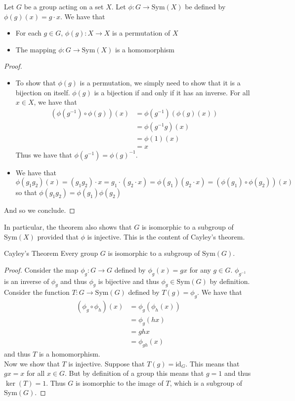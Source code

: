 \documentclass[a4paper]{article}
\begin{document}
\begin{prp}{}{} Let $G$ be a group acting on a set $X$. Let $\phi:G\to\text{Sym}(X)$ be defined by $\phi(g)(x)=g\cdot x$. We have that 
\begin{itemize}
\item For each $g\in G$, $\phi(g):X\to X$ is a permutation of $X$
\item The mapping $\phi:G\to\text{Sym}(X)$ is a homomorphism
\end{itemize}
\begin{proof}~\\
\begin{itemize}
\item To show that $\phi(g)$ is a permutation, we simply need to show that it is a bijection on itself. $\phi(g)$ is a bijection if and only if it has an inverse. For all $x\in X$, we have that 
\begin{align*}
(\phi(g^{-1})\circ\phi(g))(x)&=\phi(g^{-1})(\phi(g)(x))\\
&=\phi(g^{-1}g)(x)\\
&=\phi(1)(x)\\
&=x
\end{align*} Thus we have that $\phi(g^{-1})=\phi(g)^{-1}$. 
\item We have that $$\phi(g_1g_2)(x)=(g_1g_2)\cdot x=g_1\cdot(g_2\cdot x)=\phi(g_1)(g_2\cdot x)=(\phi(g_1)\circ\phi(g_2))(x)$$ so that $\phi(g_1g_2)=\phi(g_1)\phi(g_2)$
\end{itemize}
And so we conclude. 
\end{proof}
\end{prp}

In particular, the theorem also shows that $G$ is isomorphic to a subgroup of $\text{Sym}(X)$ provided that $\phi$ is injective. This is the content of Cayley's theorem. 

\begin{thm}{Cayley's Theorem}{} Every group $G$ is isomorphic to a subgroup of $\text{Sym}(G)$. 
\begin{proof}
Consider the map $\phi_g:G\to G$ defined by $\phi_g(x)=gx$ for any $g\in G$. $\phi_{g^{-1}}$ is an inverse of $\phi_g$ and thus $\phi_g$ is bijective and thus $\phi_g\in\text{Sym}(G)$ by definition. \\
Consider the function $T:G\to\text{Sym}(G)$ defined by $T(g)=\phi_g$. We have that 
\begin{align*}
(\phi_g\circ\phi_h)(x)&=\phi_g(\phi_h(x))\\
&=\phi_g(hx)\\
&=ghx\\
&=\phi_{gh}(x)
\end{align*}
and thus $T$ is a homomorphism. \\
Now we show that $T$ is injective. Suppose that $T(g)=\text{id}_G$. This means that $gx=x$ for all $x\in G$. But by definition of a group this means that $g=1$ and thus $\ker(T)=1$. Thus $G$ is isomorphic to the image of $T$, which is a subgroup of $\text{Sym}(G)$. 
\end{proof}
\end{thm}
\end{document}
